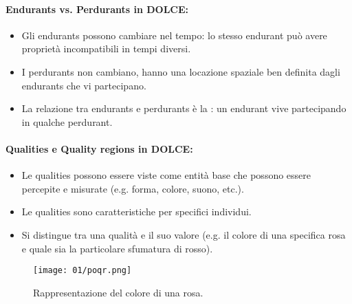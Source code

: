 

\paragraph{Endurants vs. Perdurants in DOLCE:}

\begin{itemize}
  \item Gli endurants possono cambiare nel tempo: lo stesso endurant può avere proprietà incompatibili in tempi diversi. 
  \item I perdurants non cambiano, hanno una locazione spaziale ben definita dagli endurants che vi partecipano.
  \item La relazione tra endurants e perdurants è la : un endurant vive partecipando in qualche perdurant. 
\end{itemize}

\paragraph{Qualities e Quality regions in DOLCE:}

\begin{itemize}
  \item Le qualities possono essere viste come entità base che possono essere percepite e misurate (e.g. forma, colore, suono, etc.). 
  \item Le qualities sono caratteristiche per specifici individui. 
  \item Si distingue tra una qualità e il suo valore (e.g. il colore di una specifica rosa e quale sia la particolare sfumatura di rosso).
\end{itemize}


\begin{figure}[h]
    \centering
    \texttt{[image: 01/poqr.png]}
    \caption{Rappresentazione del colore di una rosa.}
\end{figure}

